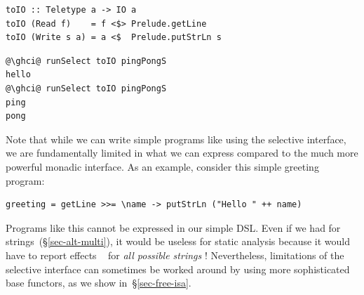 \vspace{1mm}
\begin{verbatim}
toIO :: Teletype a -> IO a
toIO (Read f)    = f <$> Prelude.getLine
toIO (Write s a) = a <$  Prelude.putStrLn s
\end{verbatim}
\vspace{0mm}
\begin{verbatim}
@\ghci@ runSelect toIO pingPongS
hello
@\ghci@ runSelect toIO pingPongS
ping
pong
\end{verbatim}
\vspace{1mm}

\noindent
Note that while we can write simple programs like  using the
selective interface, we are fundamentally limited in what we can express
compared to the much more powerful monadic interface. As an example, consider
this simple greeting program:

\vspace{1mm}
\begin{verbatim}
greeting = getLine >>= \name -> putStrLn ("Hello " ++ name)
\end{verbatim}
\vspace{1mm}

\noindent
Programs like this cannot be expressed in our simple  DSL. Even if
we had  for strings~(\S\ref{sec-alt-multi}), it would be useless for
static analysis because it would have to report effects ~ for
\emph{all possible strings} ! Nevertheless, limitations of the selective
interface can sometimes be worked around by using more sophisticated base
functors, as we show in~\S\ref{sec-free-isa}.


